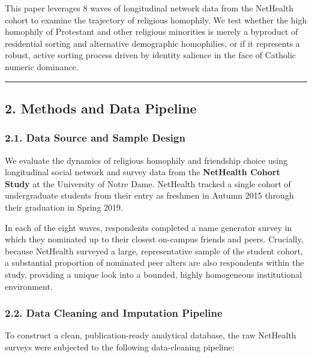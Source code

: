 \documentclass[
  letterpaper,
  DIV=11,
  numbers=noendperiod]{scrartcl}
\begin{document}
This paper leverages 8 waves of longitudinal network data from the
NetHealth cohort to examine the trajectory of religious homophily. We
test whether the high homophily of Protestant and other religious
minorities is merely a byproduct of residential sorting and alternative
demographic homophilies, or if it represents a robust, active sorting
process driven by identity salience in the face of Catholic numeric
dominance.

\begin{center}\rule{0.5\linewidth}{0.5pt}\end{center}

\subsection{2. Methods and Data
Pipeline}\label{methods-and-data-pipeline}

\subsubsection{2.1. Data Source and Sample
Design}\label{data-source-and-sample-design}

We evaluate the dynamics of religious homophily and friendship choice
using longitudinal social network and survey data from the
\textbf{NetHealth Cohort Study} at the University of Notre Dame.
NetHealth tracked a single cohort of undergraduate students from their
entry as freshmen in Autumn 2015 through their graduation in Spring
2019.

In each of the eight waves, respondents completed a name generator
survey in which they nominated up to their closest on-campus friends and
peers. Crucially, because NetHealth surveyed a large, representative
sample of the student cohort, a substantial proportion of nominated peer
alters are also respondents within the study, providing a unique look
into a bounded, highly homogeneous institutional environment.

\subsubsection{2.2. Data Cleaning and Imputation
Pipeline}\label{data-cleaning-and-imputation-pipeline}

To construct a clean, publication-ready analytical database, the raw
NetHealth surveys were subjected to the following data-cleaning
pipeline:
\end{document}
